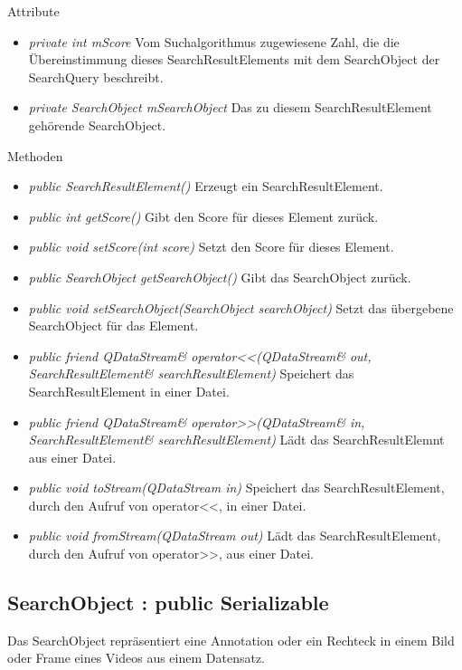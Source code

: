 Attribute
\begin{itemize}
\item\textit{private int mScore} Vom Suchalgorithmus zugewiesene Zahl, die die Übereinstimmung dieses SearchResultElements mit dem SearchObject der SearchQuery beschreibt.
\item\textit{private SearchObject mSearchObject} Das zu diesem SearchResultElement gehörende SearchObject.
\end{itemize}

Methoden
\begin{itemize}
\item \textit{public SearchResultElement()} Erzeugt ein SearchResultElement.
\item \textit{public int getScore()} Gibt den Score für dieses Element zurück.
\item \textit{public void setScore(int score)} Setzt den Score für dieses Element.
\item \textit{public SearchObject getSearchObject()} Gibt das SearchObject zurück.
\item \textit{public void setSearchObject(SearchObject searchObject)} Setzt das übergebene SearchObject für das Element.
\item \textit{public friend QDataStream\& operator<<(QDataStream\& out, SearchResultElement\& searchResultElement)} Speichert das SearchResultElement in einer Datei.
\item \textit{public friend QDataStream\& operator>>(QDataStream\& in, SearchResultElement\& searchResultElement)} Lädt das SearchResultElemnt aus einer Datei.
\item \textit{public void toStream(QDataStream in)} Speichert das SearchResultElement, durch den Aufruf von operator<<, in einer Datei.
\item \textit{public void fromStream(QDataStream out)} Lädt das SearchResultElement, durch den Aufruf von operator>>, aus einer Datei.
\end{itemize}

\subsection*{SearchObject : public Serializable}
Das SearchObject repräsentiert eine Annotation oder ein Rechteck in einem Bild oder Frame eines Videos aus einem Datensatz.

